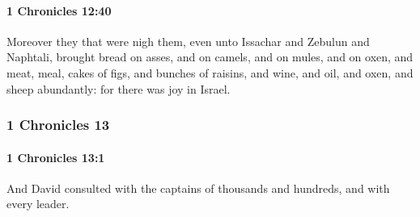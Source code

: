 		\paragraph{1 Chronicles 12:40} %
			\label{1CHRONICLES-12-40}

			Moreover they that were nigh them, even unto Issachar and Zebulun and Naphtali, brought bread on asses, and on camels, and on mules, and on oxen, and meat, meal, cakes of figs, and bunches of raisins, and wine, and oil, and oxen, and sheep abundantly: for there was joy in Israel.

	\subsubsection{1 Chronicles 13} %
		\label{1CHRONICLES-13}

		\paragraph{1 Chronicles 13:1} %
			\label{1CHRONICLES-13-1}

			And David consulted with the captains of thousands and hundreds, and with every leader.

